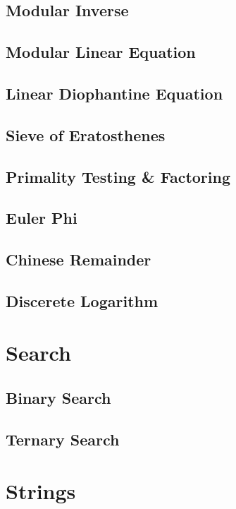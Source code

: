 		\subsection{Modular Inverse}
			
		\subsection{Modular Linear Equation}
			
		\subsection{Linear Diophantine Equation}
			
		\subsection{Sieve of Eratosthenes}
			
		\subsection{Primality Testing \& Factoring}
			
		\subsection{Euler Phi}
			
		\subsection{Chinese Remainder}
			
		\subsection{Discerete Logarithm}
			
	\section{Search}
		\subsection{Binary Search}
			
		\subsection{Ternary Search}
			
	\section{Strings}
